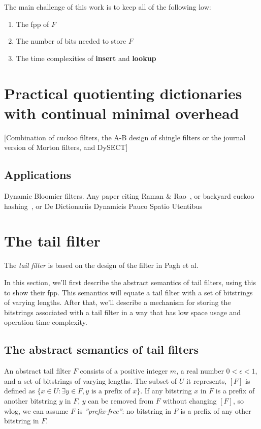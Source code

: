 \documentclass[11pt,letterpaper]{article}
\begin{document}
The main challenge of this work is to keep all of the following low:

\begin{enumerate}
\item The fpp of $F$
\item The number of bits needed to store $F$
\item The time complexities of {\bf insert} and {\bf lookup}
\end{enumerate}

\section{Practical quotienting dictionaries with continual minimal overhead}

[Combination of cuckoo filters, the A-B design of shingle filters or the journal version of Morton filters, and DySECT]

\subsection{Applications}

Dynamic Bloomier filters. Any paper citing Raman \& Rao~\cite{raman2003succinct}, or backyard cuckoo hashing~\cite{DBLP:journals/corr/abs-0912-5424}, or De Dictionariis Dynamicis Pauco Spatio Utentibus~\cite{DBLP:journals/corr/abs-cs-0512081}

\section{The tail filter}

The {\em tail filter} is based on the design of the filter in Pagh et al.~\cite{DBLP:journals/corr/abs-1304-1188}

In this section, we'll first describe the abstract semantics of tail filters, using this to show their fpp.
This semantics will equate a tail filter with a set of bitstrings of varying lengths.
After that, we'll describe a mechanism for storing the bitstrings associated with a tail filter in a way that has low space usage and operation time complexity.

\subsection{The abstract semantics of tail filters}

An abstract tail filter $F$ consists of a positive integer $m$, a real number $0 < \epsilon < 1$, and a set of bitstrings of varying lengths. %
The subset of $U$ it represents, $[F]$ is defined as $\{x \in U : \exists y \in F, y \textrm{ is a prefix of } x\}$.
If any bitstring $x$ in $F$ is a prefix of another bitstring $y$ in $F$, $y$ can be removed from $F$ without changing $[F]$, so wlog, we can assume $F$ is {\em ''prefix-free''}: no bitstring in $F$ is a prefix of any other bitstring in $F$.
\end{document}
